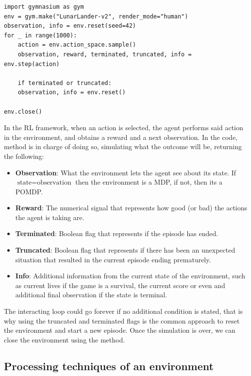 \begin{lstlisting}[caption={Initialization of an environment in Farama's gymnasium}, label={code:init_env}]
import gymnasium as gym
env = gym.make("LunarLander-v2", render_mode="human")
observation, info = env.reset(seed=42)
for _ in range(1000):
	action = env.action_space.sample() 
	observation, reward, terminated, truncated, info = env.step(action)
	
	if terminated or truncated:
	observation, info = env.reset()

env.close()
\end{lstlisting}

In the RL framework, when an action is selected, the agent performs said action in the environment, and obtains a reward and a next observation. In the code, method  is in charge of doing so, simulating what the outcome will be, returning the following:

\begin{itemize}
	\item \textbf{Observation}: What the environment lets the agent see about its state. If $\text{state}=\text{observation}$ then the environment is a MDP, if not, then its a POMDP.
	\item  \textbf{Reward}: The numerical signal that represents how good (or bad) the actions the agent is taking are.
	\item \textbf{Terminated}: Boolean flag that represents if the episode has ended.
	\item  \textbf{Truncated}: Boolean flag that represents if there has been an unexpected situation that resulted in the current episode ending prematurely. 
	\item \textbf{Info}: Additional information from the current state of the environment, such as current lives if the game is a survival, the current score or even and additional final observation if the state is terminal.
\end{itemize}

The interacting loop could go forever if no additional condition is stated, that is why using the truncated and terminated flags is the common approach to reset the environment and start a new episode. Once the simulation is over, we can close the environment using the  method.

\subsection{Processing techniques of an environment}
\label{sec:proc_env}

